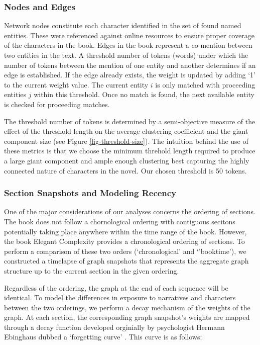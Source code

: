 \subsubsection{Nodes and Edges}
Network nodes constitute each character identified in the set of found named entities. These were referenced against online resources to ensure proper coverage of the characters in the book. Edges in the book represent a co-mention between two entities in the text. A threshold number of tokens (words) under which the number of tokens between the mention of one entity and another determines if an edge is established. If the edge already exists, the weight is updated by adding `1' to the current weight value. The current entity $i$ is only matched with proceeding entities $j$ within this threshold. Once no match is found, the next available entity is checked for proceeding matches.

The threshold number of tokens is determined by a semi-objective measure of the effect of the threshold length on the average clustering coefficient and the giant component size (see Figure \ref{fig-threshold-size}). The intuition behind the use of these metrics is that we choose the minimum threhold length required to produce a large giant component and ample enough clustering best capturing the highly connected nature of characters in the novel. Our chosen threshold is 50 tokens.

\subsubsection{Section Snapshots and Modeling Recency}
One of the major considerations of our analyses concerns the ordering of sections. The book does not follow a chornological ordering with contiguous secitons potentially taking place anywhere within the time range of the book. However, the book Elegant Complexity \cite{carlisle_2007} provides a chronological ordering of sections. To perform a comparison of these two orders (`chronological' and `'booktime'), we constructed a timelapse of graph snapshots that represents the aggregate graph structure up to the current section in the given ordering. 

Regardless of the ordering, the graph at the end of each sequence will be identical. To model the differences in exposure to narratives and characters between the two orderings, we perform a decay mechanism of the weights of the graph. At each section, the corresponding graph snapshot's weights are mapped through a decay function developed orginially by psychologist Hermann Ebinghaus dubbed a `forgetting curve' \cite{murre2015replication}. This curve is as follows:


